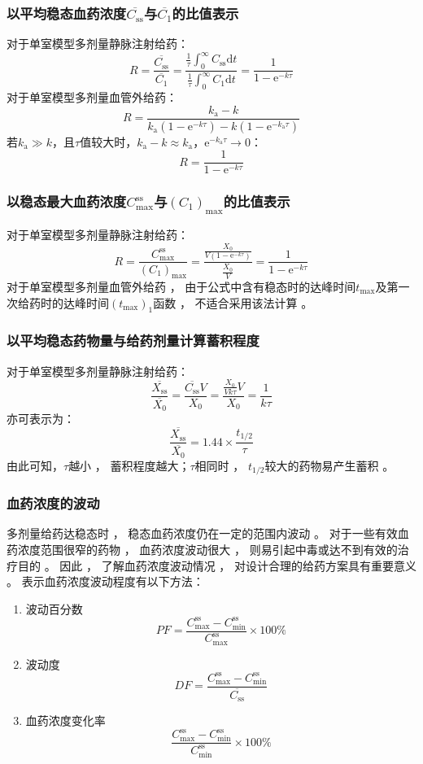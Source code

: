 \documentclass[dvipsnames, svgnames, x11names]{beamer}
\begin{document}
\begin{frame}
	\frametitle{以平均稳态血药浓度$\overline{C_\mathrm{ss}}$与$\overline{C_1}$的比值表示}
	对于单室模型多剂量静脉注射给药：
	\[
		R = \frac{\overline{C_\mathrm{ss}}}{\overline{C_1}} = \frac{\frac{1}{\tau}\int_{0}^{\infty}C_\mathrm{ss}\mathrm{d}t}{\frac{1}{\tau}\int_{0}^{\infty}C_1\mathrm{d}t} = \frac{1}{1-\mathrm{e}^{-k\tau}}
	\]
	对于单室模型多剂量血管外给药：
	\[
		R=\frac{k_\mathrm{a}- k }{k_\mathrm{a}(1-\mathrm{e}^{-k\tau})-k(1-\mathrm{e}^{-k_\mathrm{a}\tau})}
	\]
	若$k_{\mathrm{a}}\gg k$，且$\tau$值较大时，$k_\mathrm{a}- k \approx k_\mathrm{a}$，$\mathrm{e}^{-k_{\mathrm{a}}\tau} \to 0$：
	\[
		R = \frac{1}{1-\mathrm{e}^{-k\tau}}
	\]
\end{frame}


\begin{frame}
	\frametitle{以稳态最大血药浓度$C_{\max}^\mathrm{ss}$与$(C_{1})_{\max}$的比值表示}
	对于单室模型多剂量静脉注射给药：
	\[
		R = \frac{C_{\max}^\mathrm{ss}}{(C_{1})_{\max}} = \frac{\frac{X_0}{V(1-\mathrm{e}^{-k\tau})}}{\frac{X_0}{V}} = \frac{1}{1-\mathrm{e}^{-k\tau}}
	\]
	对于单室模型多剂量血管外给药 ， 由于公式中含有稳态时的达峰时间$t_{\max}$及第一次给药时的达峰时间$(t_{\max})_1$函数 ， 不适合采用该法计算 。
\end{frame}


\begin{frame}
	\frametitle{以平均稳态药物量与给药剂量计算蓄积程度}
	对于单室模型多剂量静脉注射给药：
	\[
		\frac{\overline{X_\mathrm{ss}}}{\overline{X_{0}}}=\frac{\overline{C_\mathrm{ss}}V}{X_{0}}=\frac{\frac{X_{0}}{Vk\tau}V}{X_{0}}=\frac{1}{k\tau}
	\]
	亦可表示为：
	\[
		\frac{\overline{X_\mathrm{ss}}}{\overline{X_{0}}} = 1.44\times \frac{t_{1/2}}{\tau}
	\]
	由此可知，$\tau$越小 ， 蓄积程度越大；$\tau$相同时 ， $t_{1/2}$较大的药物易产生蓄积 。
\end{frame}


\begin{frame}
	\frametitle{血药浓度的波动}
	多剂量给药达稳态时 ， 稳态血药浓度仍在一定的范围内波动 。 对于一些有效血药浓度范围很窄的药物 ， 血药浓度波动很大 ， 则易引起中毒或达不到有效的治疗目的 。 因此 ， 了解血药浓度波动情况 ， 对设计合理的给药方案具有重要意义 。 表示血药浓度波动程度有以下方法：
	\begin{enumerate}
	  \item 波动百分数
		\[
			PF=\frac{C_{\max}^{\mathrm{ss}}-C_{\min}^{\mathrm{ss}}}{C_{\max}^{\mathrm{ss}}}\times100\%
		\]
	  \item 波动度
		\[
			DF=\frac{C_{\max}^{\mathrm{ss}}-C_{\min}^{\mathrm{ss}}}{\overline{C_{\mathrm{ss}}}}
		\]
	  \item 血药浓度变化率
	  \[
		  \frac{C_{\max}^{\mathrm{ss}}-C_{\min}^{\mathrm{ss}}}{C_{\min}^{\mathrm{ss}}}\times100\%
	  \]
	\end{enumerate}
\end{frame}
\end{document}
